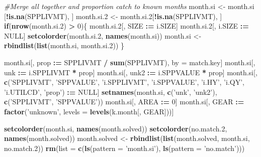 \documentclass[]{article}
\newenvironment{Shaded}{\begin{snugshade}}{\end{snugshade}}
\newcommand{\KeywordTok}[1]{\textcolor[rgb]{0.13,0.29,0.53}{\textbf{#1}}}
\newcommand{\DataTypeTok}[1]{\textcolor[rgb]{0.13,0.29,0.53}{#1}}
\newcommand{\DecValTok}[1]{\textcolor[rgb]{0.00,0.00,0.81}{#1}}
\newcommand{\StringTok}[1]{\textcolor[rgb]{0.31,0.60,0.02}{#1}}
\newcommand{\CommentTok}[1]{\textcolor[rgb]{0.56,0.35,0.01}{\textit{#1}}}
\newcommand{\OtherTok}[1]{\textcolor[rgb]{0.56,0.35,0.01}{#1}}
\newcommand{\ControlFlowTok}[1]{\textcolor[rgb]{0.13,0.29,0.53}{\textbf{#1}}}
\newcommand{\OperatorTok}[1]{\textcolor[rgb]{0.81,0.36,0.00}{\textbf{#1}}}
\newcommand{\ErrorTok}[1]{\textcolor[rgb]{0.64,0.00,0.00}{\textbf{#1}}}
\newcommand{\NormalTok}[1]{#1}
\begin{document}
\begin{Shaded}
\begin{Highlighting}[]
  \CommentTok{#Merge all together and proportion catch to known months}
\NormalTok{  month.si   <-}\StringTok{ }\NormalTok{month.si  [}\OperatorTok{!}\KeywordTok{is.na}\NormalTok{(SPPLIVMT), ]}
\NormalTok{  month.si.}\DecValTok{2}\NormalTok{ <-}\StringTok{ }\NormalTok{month.si.}\DecValTok{2}\NormalTok{[}\OperatorTok{!}\KeywordTok{is.na}\NormalTok{(SPPLIVMT), ]}
  \ControlFlowTok{if}\NormalTok{(}\KeywordTok{nrow}\NormalTok{(month.si.}\DecValTok{2}\NormalTok{) }\OperatorTok{>}\StringTok{ }\DecValTok{0}\NormalTok{)\{}
\NormalTok{    month.si.}\DecValTok{2}\NormalTok{[, SIZE   }\OperatorTok{:}\ErrorTok{=}\StringTok{ }\NormalTok{i.SIZE]}
\NormalTok{    month.si.}\DecValTok{2}\NormalTok{[, i.SIZE }\OperatorTok{:}\ErrorTok{=}\StringTok{ }\OtherTok{NULL}\NormalTok{]}
    \KeywordTok{setcolorder}\NormalTok{(month.si.}\DecValTok{2}\NormalTok{, }\KeywordTok{names}\NormalTok{(month.si))}
\NormalTok{    month.si <-}\StringTok{ }\KeywordTok{rbindlist}\NormalTok{(}\KeywordTok{list}\NormalTok{(month.si, month.si.}\DecValTok{2}\NormalTok{))}
\NormalTok{    \}}
   
\NormalTok{  month.si[, prop }\OperatorTok{:}\ErrorTok{=}\StringTok{ }\NormalTok{SPPLIVMT }\OperatorTok{/}\StringTok{ }\KeywordTok{sum}\NormalTok{(SPPLIVMT), by =}\StringTok{ }\NormalTok{match.key]}
\NormalTok{  month.si[, unk  }\OperatorTok{:}\ErrorTok{=}\StringTok{ }\NormalTok{i.SPPLIVMT }\OperatorTok{*}\StringTok{ }\NormalTok{prop]}
\NormalTok{  month.si[, unk2 }\OperatorTok{:}\ErrorTok{=}\StringTok{ }\NormalTok{i.SPPVALUE }\OperatorTok{*}\StringTok{ }\NormalTok{prop]}
\NormalTok{  month.si[, }\KeywordTok{c}\NormalTok{(}\StringTok{'SPPLIVMT'}\NormalTok{, }\StringTok{'SPPVALUE'}\NormalTok{, }\StringTok{'i.SPPLIVMT'}\NormalTok{, }\StringTok{'i.SPPVALUE'}\NormalTok{, }\StringTok{'i.HY'}\NormalTok{, }\StringTok{'i.QY'}\NormalTok{, }
               \StringTok{'i.UTILCD'}\NormalTok{, }\StringTok{'prop'}\NormalTok{) }\OperatorTok{:}\ErrorTok{=}\StringTok{ }\OtherTok{NULL}\NormalTok{]}
  \KeywordTok{setnames}\NormalTok{(month.si, }\KeywordTok{c}\NormalTok{(}\StringTok{'unk'}\NormalTok{, }\StringTok{'unk2'}\NormalTok{), }\KeywordTok{c}\NormalTok{(}\StringTok{'SPPLIVMT'}\NormalTok{, }\StringTok{'SPPVALUE'}\NormalTok{))}
\NormalTok{  month.si[, AREA }\OperatorTok{:}\ErrorTok{=}\StringTok{ }\DecValTok{0}\NormalTok{]}
\NormalTok{  month.si[, GEAR }\OperatorTok{:}\ErrorTok{=}\StringTok{ }\KeywordTok{factor}\NormalTok{(}\StringTok{'unknown'}\NormalTok{, }\DataTypeTok{levels =} \KeywordTok{levels}\NormalTok{(k.month[, GEAR]))]}
  
  \KeywordTok{setcolorder}\NormalTok{(month.si,  }\KeywordTok{names}\NormalTok{(month.solved))}
  \KeywordTok{setcolorder}\NormalTok{(no.match.}\DecValTok{2}\NormalTok{, }\KeywordTok{names}\NormalTok{(month.solved))}
\NormalTok{  month.solved <-}\StringTok{ }\KeywordTok{rbindlist}\NormalTok{(}\KeywordTok{list}\NormalTok{(month.solved, month.si, no.match.}\DecValTok{2}\NormalTok{))}
  \KeywordTok{rm}\NormalTok{(}\DataTypeTok{list =} \KeywordTok{c}\NormalTok{(}\KeywordTok{ls}\NormalTok{(}\DataTypeTok{pattern =} \StringTok{'month.si'}\NormalTok{), }\KeywordTok{ls}\NormalTok{(}\DataTypeTok{pattern =} \StringTok{'no.match'}\NormalTok{)))}
  

\end{Highlighting}
\end{Shaded}
\end{document}
